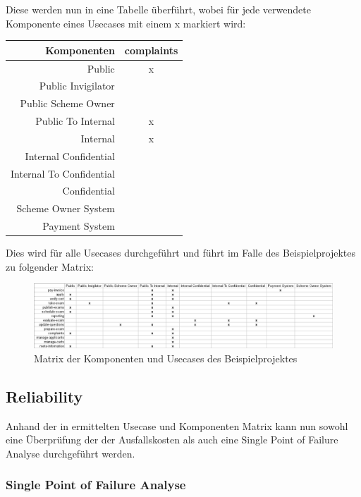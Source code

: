 Diese werden nun in eine Tabelle überführt, wobei für jede verwendete Komponente eines Usecases mit einem x markiert wird:

\hfill \break

\begin{tabular}{ | r | c | }
    \hline
    Komponenten & complaints \\
    \hline
    Public & x \\
    \hline
    Public Invigilator & \\
    \hline
    Public Scheme Owner & \\
    \hline
    Public To Internal & x \\
    \hline
    Internal & x \\
    \hline
    Internal Confidential & \\
    \hline
    Internal To Confidential & \\
    \hline
    Confidential & \\
    \hline
    Scheme Owner System & \\
    \hline
    Payment System & \\
    \hline
\end{tabular}

\hfill \break

Dies wird für alle Usecases durchgeführt und führt im Falle des Beispielprojektes zu folgender Matrix:

\begin{figure}[H]
    \centering
    \includegraphics[scale=0.4]{img/matrix.png}
    \caption{Matrix der Komponenten und Usecases des Beispielprojektes}
    \label{fig:matrix}
\end{figure}




\subsection{Reliability}
Anhand der in ermittelten Usecase und Komponenten Matrix kann nun sowohl eine Überprüfung der der Ausfallskosten als auch eine Single Point of Failure Analyse durchgeführt werden.

\subsubsection{Single Point of Failure Analyse}

